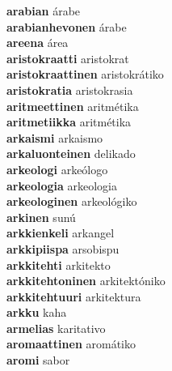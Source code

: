 \textbf{arabian } árabe \\
\textbf{arabianhevonen } árabe \\
\textbf{areena } área \\
\textbf{aristokraatti } aristokrat \\
\textbf{aristokraattinen } aristokrátiko \\
\textbf{aristokratia } aristokrasia \\
\textbf{aritmeettinen } aritmétika \\
\textbf{aritmetiikka } aritmétika \\
\textbf{arkaismi } arkaismo \\
\textbf{arkaluonteinen } delikado \\
\textbf{arkeologi } arkeólogo \\
\textbf{arkeologia } arkeologia \\
\textbf{arkeologinen } arkeológiko \\
\textbf{arkinen } sunú \\
\textbf{arkkienkeli } arkangel \\
\textbf{arkkipiispa } arsobispu \\
\textbf{arkkitehti } arkitekto \\
\textbf{arkkitehtoninen } arkitektóniko \\
\textbf{arkkitehtuuri } arkitektura \\
\textbf{arkku } kaha \\
\textbf{armelias } karitativo \\
\textbf{aromaattinen } aromátiko \\
\textbf{aromi } sabor \\
